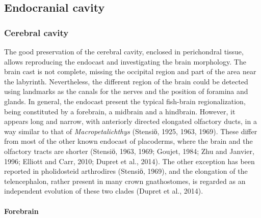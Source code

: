 \documentclass[12pt,letterpaper]{article}
\begin{document}
\subsection{Endocranial cavity}
\subsubsection{Cerebral cavity}
The good preservation of the cerebral cavity, enclosed in perichondral tissue, allows reproducing the endocast and investigating the brain morphology. The brain cast is not complete, missing the occipital region and part of the area near the labyrinth. Nevertheless, the different region of the brain could be detected using landmarks as the canals for the nerves and the position of foramina and glands. In general, the endocast present the typical fish-brain regionalization, being constituted by a forebrain, a midbrain and a hindbrain. However, it appears long and narrow, with anteriorly directed elongated olfactory ducts, in a way similar to that of \textit{Macropetalichthys} (Stensiӧ, 1925, 1963, 1969). These differ from most of the other known endocast of placoderms, where the brain and the olfactory tracts are shorter (Stensiӧ, 1963, 1969; Goujet, 1984; Zhu and Janvier, 1996; Elliott and Carr, 2010; Dupret et al., 2014). The other exception has been reported in pholidosteid arthrodires (Stensiӧ, 1969), and the elongation of the telencephalon, rather present in many crown gnathostomes, is regarded as an independent evolution of these two clades (Dupret et al., 2014). 

\paragraph{Forebrain}
\end{document}
